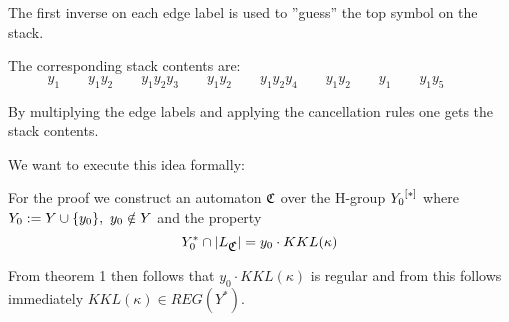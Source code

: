 The first inverse on each edge label is used to ''guess'' the top symbol on
the stack.

The corresponding stack contents are:
\[ y_1 \qquad y_1 y_2 \qquad y_1 y_2 y_3 \qquad y_1 y_2 \qquad y_1 y_2 y_4
\qquad y_1 y_2 \qquad y_1 \qquad y_1 y_5 \qquad \]

By multiplying the edge labels and applying the cancellation rules one gets the
stack contents.

We want to execute this idea formally:

For the proof we construct an automaton $\mbox{$\mathfrak{C}$}$ over the H-group $\mbox{${Y_0}^{[*]}$}$
where $Y_0 := Y \cup \mbox{$\{y_0\}$},\ y_0 \notin Y$ and the property
\[ Y_0^* \cap |L_{\mbox{$\mathfrak{C}$}}| = y_0 \cdot KKL(\kappa) \]

From theorem 1 then follows that $y_0 \cdot KKL(\kappa)$ is regular and from
this follows immediately $KKL(\kappa) \in REG(Y^*)$.


